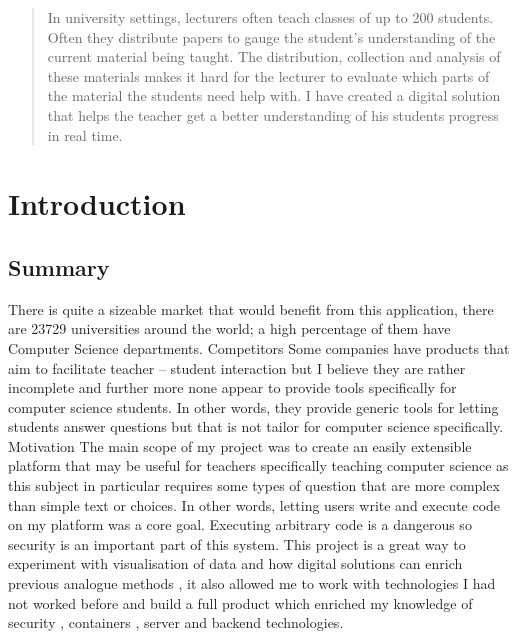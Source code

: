 \documentclass[12pt]{article}
\begin{document}
\maketitle

\clearpage

\begin{abstract}
In university settings, lecturers often teach classes of up to 200 students. Often they distribute papers to gauge the student’s understanding of the current material being taught. The distribution, collection and analysis of these materials makes it hard for the lecturer to evaluate which parts of the material the students need help with.
I have created a digital solution that helps the teacher get a better understanding of his students progress in real time.

\end{abstract}
\clearpage




\section{Introduction}
\subsection{Summary}
There is quite a sizeable market that would benefit from this application, there are 23729 universities around the world; a high percentage of them have Computer Science departments.
Competitors
Some companies have products that aim to facilitate teacher – student interaction but I believe they are rather incomplete and further more none appear to provide tools specifically for computer science students. In other words, they provide generic tools for letting students answer questions but that is not tailor for computer science specifically.
Motivation
The main scope of my project was to create an easily extensible platform that may be useful for teachers specifically teaching computer science as this subject in particular requires some types of question that are more complex than simple text or choices. In other words, letting users write and execute code on my platform was a core goal. Executing arbitrary code is a dangerous so security is an important part of this system.
This project is a great way to experiment with visualisation of data and how digital solutions can enrich previous analogue methods , it also allowed me to work with technologies I had not worked before and build a full product which enriched my knowledge of security , containers , server and backend technologies.
\end{document}
